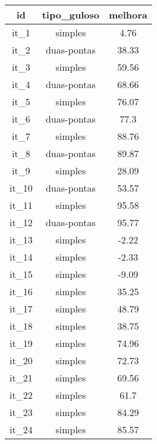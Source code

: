 \begin{table}[H]
    \centering
    {\begin{tabular}{ccc}
        \hline
        id & tipo\_guloso & melhora \\
        \hline
        it\_1 & simples & 4.76 \\
        it\_2 & duas-pontas & 38.33 \\
        it\_3 & simples & 59.56 \\
        it\_4 & duas-pontas & 68.66 \\
        it\_5 & simples & 76.07 \\
        it\_6 & duas-pontas & 77.3 \\
        it\_7 & simples & 88.76 \\
        it\_8 & duas-pontas & 89.87 \\
        it\_9 & simples & 28.09 \\
        it\_10 & duas-pontas & 53.57 \\
        it\_11 & simples & 95.58 \\
        it\_12 & duas-pontas & 95.77 \\
        it\_13 & simples & -2.22 \\
        it\_14 & simples & -2.33 \\
        it\_15 & simples & -9.09 \\
        it\_16 & simples & 35.25 \\
        it\_17 & simples & 48.79 \\
        it\_18 & simples & 38.75 \\
        it\_19 & simples & 74.96 \\
        it\_20 & simples & 72.73 \\
        it\_21 & simples & 69.56 \\
        it\_22 & simples & 61.7 \\
        it\_23 & simples & 84.29 \\
        it\_24 & simples & 85.57 \\
        \hline
    \end{tabular}}
    \caption{}
    \label{}
\end{table}
